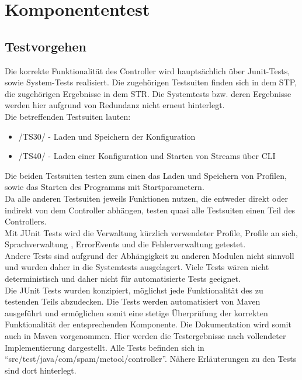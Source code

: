 \chapter{Komponententest}

\section{Testvorgehen}

Die korrekte Funktionalität des Controller wird hauptsächlich über Junit-Tests, sowie System-Tests realisiert.
Die zugehörigen Testsuiten finden sich in dem STP, die zugehörigen Ergebnisse in dem STR. Die Systemtests bzw. deren Ergebnisse werden
hier aufgrund von Redundanz nicht erneut hinterlegt.\\
Die betreffenden Testsuiten lauten:
\begin{itemize}
  \item /TS30/ - Laden und Speichern der Konfiguration
  \item /TS40/ - Laden einer Konfiguration und Starten von Streams über CLI
\end{itemize}
Die beiden Testsuiten testen zum einen das Laden und Speichern von Profilen, sowie das Starten des Programms mit Startparametern.\\
Da alle anderen Testsuiten jeweils Funktionen nutzen, die entweder direkt oder indirekt von dem Controller abhängen,
testen quasi alle Testsuiten einen Teil des Controllers.\\
\newline
Mit JUnit Tests wird die Verwaltung kürzlich verwendeter Profile, Profile an sich, Sprachverwaltung , ErrorEvents und die Fehlerverwaltung getestet.\\
Andere Tests sind aufgrund der Abhängigkeit zu anderen Modulen nicht sinnvoll und wurden daher in die Systemtests ausgelagert. Viele Tests wären nicht deterministisch und daher nicht für automatisierte Tests geeignet.\\
\newline
Die JUnit Tests wurden konzipiert, möglichst jede Funktionalität des zu testenden Teils abzudecken. Die Tests werden automatisiert von Maven ausgeführt
und ermöglichen somit eine stetige Überprüfung der korrekten Funktionalität der entsprechenden Komponente.
Die Dokumentation wird somit auch in Maven vorgenommen. Hier werden die Testergebnisse nach vollendeter Implementierung dargestellt.
Alle Tests befinden sich in "`src/test/java/com/spam/mctool/controller"'. Nähere Erläuterungen zu den Tests sind dort hinterlegt.

